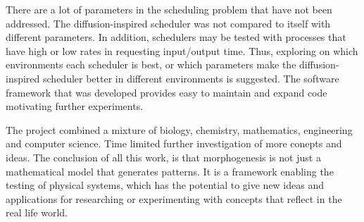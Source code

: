 There are a lot of parameters in the scheduling problem that have not been addressed. The diffusion-inspired scheduler was not compared to itself with different parameters. In addition, schedulers may be tested with processes that have high or low rates in requesting input/output time. Thus, exploring on which environments each scheduler is best, or which parameters make the diffusion-inspired scheduler better in different environments is suggested. The software framework that was developed provides easy to maintain and expand code motivating further experiments.

The project combined a mixture of biology, chemistry, mathematics, engineering and computer science. Time limited further investigation of more conepts and ideas. The conclusion of all this work, is that morphogenesis is not just a mathematical model that generates patterns. It is a framework enabling the testing of physical systems, which has the potential to give new ideas and applications for researching or experimenting with concepts that reflect in the real life world.  
